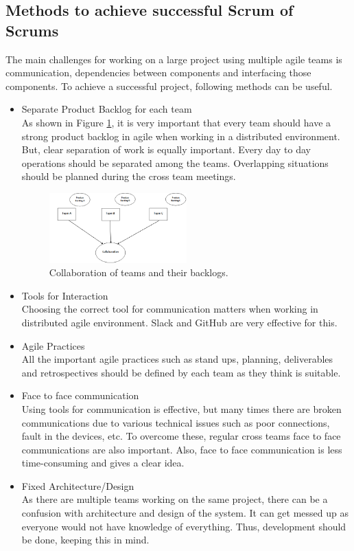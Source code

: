 \documentclass[sigconf]{acmart}
\begin{document}
\subsection{Methods to achieve successful Scrum of Scrums}
The main challenges for working on a large project using multiple agile teams is communication, dependencies between components and interfacing those components. To achieve a successful project, following methods can be useful\cite{SunitP}. 
\begin{itemize}
\item Separate Product Backlog for each team
\\As shown in Figure \ref{fig:PBCollab}, it is very important that every team should have a strong product backlog in agile when working in a distributed environment. But, clear separation of work is equally important. Every day to day operations should be separated among the teams. Overlapping situations should be planned during the cross team meetings.
\begin{figure}[H]
 \includegraphics[width=0.5\textwidth]{PBCollab}
  \caption{Collaboration of teams and their backlogs.}
  \label{fig:PBCollab}
\end{figure}

\item Tools for Interaction
\\Choosing the correct tool for communication matters when working in distributed agile environment. Slack and GitHub are very effective for this.

\item Agile Practices
\\All the important agile practices such as stand ups, planning, deliverables and retrospectives should be defined by each team as they think is suitable.

\item Face to face communication 
\\Using tools for communication is effective, but many times there are broken communications due to various technical issues such as poor connections, fault in the devices, etc. To overcome these, regular cross teams face to face communications are also important. Also, face to face communication is less time-consuming and gives a clear idea.

\item Fixed Architecture/Design
\\As there are multiple teams working on the same project, there can be a confusion with architecture and design of the system. It can get messed up as everyone would not have knowledge of everything. Thus, development should be done, keeping this in mind.
\end{itemize}
\end{document}
